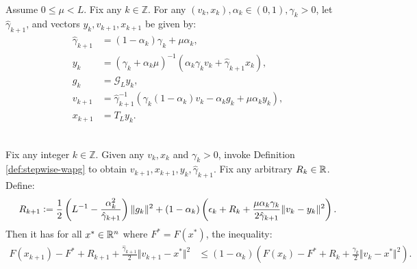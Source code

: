 \documentclass[12pt]{article}
\begin{document}
        \begin{definition}\label{def:stepwise-wapg}\;\\
            Assume $0 \le \mu < L$.
            Fix any $k \in \mathbb Z$. 
            For any $(v_k, x_k), \alpha_k \in (0, 1), \gamma_k > 0$, let $\hat \gamma_{k + 1}$, and vectors $y_k, v_{k + 1}, x_{k + 1}$ be given by: 
            \begin{align*}
                \hat \gamma_{k + 1} &= (1 - \alpha_k)\gamma_k + \mu \alpha_k, 
                \\
                y_k &= 
                (\gamma_k + \alpha_k \mu)^{-1}(\alpha_k \gamma_k v_k + \hat\gamma_{k + 1} x_k), 
                \\
                g_k &= \mathcal G_L y_k, 
                \\
                v_{k + 1} &= \hat\gamma^{-1}_{k + 1}
                (\gamma_k(1 - \alpha_k) v_k - \alpha_k g_k + \mu \alpha_k y_k), 
                \\
                x_{k + 1} &= T_L y_k. 
            \end{align*}
        \end{definition}

        \begin{proposition}\label{prop:stepwise-lyapunov}\;\\
            Fix any integer $k \in \mathbb Z$.
            Given any $v_k, x_k$ and $\gamma_k > 0$, invoke Definition \ref{def:stepwise-wapg} to obtain $v_{k + 1}, x_{k + 1}, y_k, \hat \gamma_{k + 1}$. 
            Fix any arbitrary $R_k \in \mathbb R$.
            Define: 
            \begin{align*}
                R_{k + 1}
                \vcentcolon=
                \frac{1}{2}\left(
                    L^{-1} - \frac{\alpha_k^2}{\hat \gamma_{k + 1}}
                \right)\Vert g_k\Vert^2
                + 
                (1 - \alpha_k)
                \left(
                    \epsilon_k + R_k + 
                    \frac{\mu\alpha_k\gamma_k}{2\hat \gamma_{k + 1}}
                    \Vert v_k - y_k\Vert^2
                \right). 
            \end{align*}
            Then it has for all $x^* \in \mathbb R^n$ where $F^* = F(x^*)$, the inequality: 
            \begin{align*}
                F(x_{k + 1}) - F^* + R_{k + 1} + \frac{\hat \gamma_{k + 1}}{2}\Vert v_{k + 1} - x^*\Vert^2
                &\le 
                (1 - \alpha_k)
                \left(
                    F(x_k) - F^* + R_k + \frac{\gamma_{k}}{2}\Vert v_k - x^*\Vert^2
                \right). 
            \end{align*}
        \end{proposition}
\end{document}
